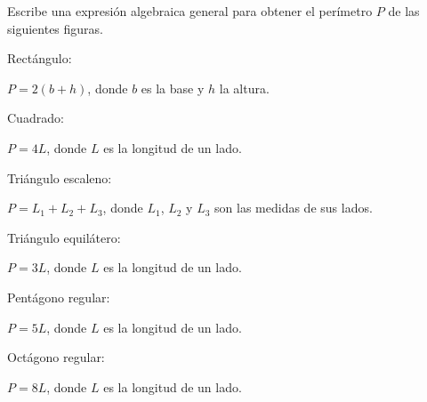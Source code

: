 Escribe una expresión algebraica general para obtener el perímetro $P$ de las siguientes figuras.

\begin{multicols}{2}
    \begin{parts}
        Rectángulo:

        \begin{solutionbox}{1.5cm}
            $P = 2(b + h)$, donde $b$ es la base y $h$ la altura.
        \end{solutionbox}

        \begin{partsolved}
            Cuadrado:%
            \begin{solutionbox}{1.5cm}
                $P = 4L$, donde $L$ es la longitud de un lado.
            \end{solutionbox}
        \end{partsolved}

        Triángulo escaleno:

        \begin{solutionbox}{1.8cm}
            $P = L_1 + L_2 + L_3$, donde $L_1$, $L_2$ y $L_3$ son las medidas de
            sus lados.
        \end{solutionbox}



        Triángulo equilátero:

        \begin{solutionbox}{1.5cm}
            $P = 3L$, donde $L$ es la longitud de un lado.
        \end{solutionbox}

        Pentágono regular:
        \begin{solutionbox}{1.5cm}
            $P = 5L$, donde $L$ es la longitud de un lado.
        \end{solutionbox}

        Octágono regular:
        \begin{solutionbox}{1.5cm}
            $P = 8L$, donde $L$ es la longitud de un lado.
        \end{solutionbox}
    \end{parts}
\end{multicols}
